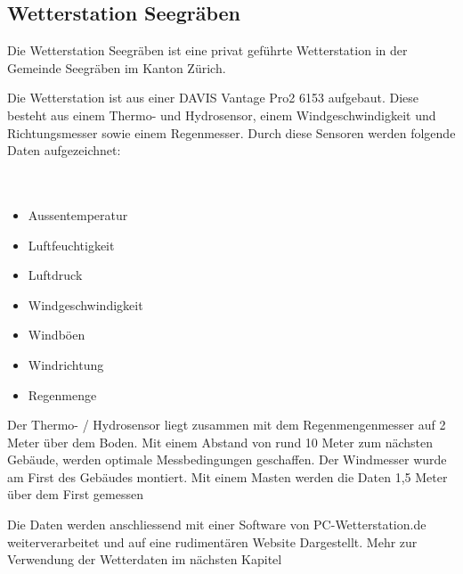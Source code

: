 \begin{refsection}
\section{Wetterstation Seegräben}

Die Wetterstation Seegräben ist eine privat geführte Wetterstation in der Gemeinde Seegräben im Kanton Zürich.

Die Wetterstation ist aus einer DAVIS Vantage Pro2 6153 aufgebaut.
Diese besteht aus einem Thermo- und  Hydrosensor, einem Windgeschwindigkeit und Richtungsmesser sowie einem Regenmesser. 
Durch diese Sensoren werden folgende Daten aufgezeichnet:
\\
\\
\\

\begin{itemize}
	\item Aussentemperatur
	\item Luftfeuchtigkeit
	\item Luftdruck
	\item Windgeschwindigkeit
	\item Windböen
	\item Windrichtung
	\item Regenmenge
\end{itemize}

Der Thermo- / Hydrosensor liegt zusammen mit dem Regenmengenmesser auf 2 Meter über dem Boden. Mit einem Abstand von rund 10 Meter zum nächsten Gebäude, werden optimale Messbedingungen geschaffen. Der Windmesser wurde am First des Gebäudes montiert. Mit einem Masten werden die Daten 1,5 Meter über dem First gemessen 

Die Daten werden anschliessend mit einer Software von PC-Wetterstation.de weiterverarbeitet und auf eine rudiment\"aren Website Dargestellt. Mehr zur Verwendung der Wetterdaten im n\"achsten Kapitel





\end{refsection}
